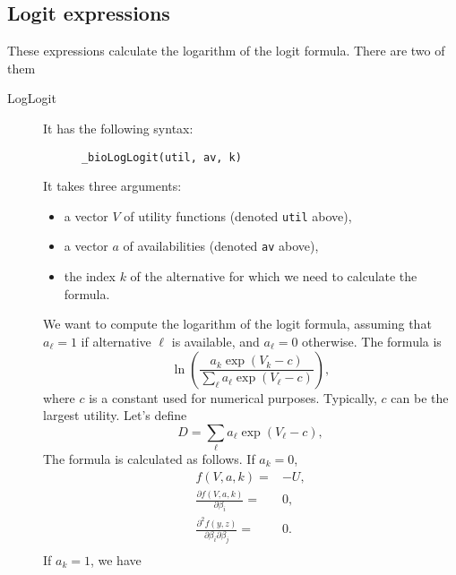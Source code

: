 \documentclass[12pt,a4paper]{article}
\begin{document}
\subsection{Logit expressions}
These expressions calculate the logarithm of the logit formula. There are two of them
\begin{description}
\item[LogLogit] It has the following syntax:
    \begin{lstlisting}
      _bioLogLogit(util, av, k)
  \end{lstlisting}
It takes three arguments:
\begin{itemize}
\item a vector $V$ of utility functions (denoted \verb+util+ above),
\item a vector $a$ of availabilities (denoted \verb+av+ above),
\item the index $k$ of the alternative for which we need to calculate the formula.
\end{itemize}
We want to compute the logarithm of the logit formula, assuming that $a_\ell=1$ if alternative $\ell$ is available, and $a_\ell=0$ otherwise. The formula is
\[
\ln\left(\frac{a_k\exp(V_k-c)}{\sum_\ell a_\ell\exp(V_\ell -c)}\right),
\]
where $c$ is a constant used for numerical purposes. Typically, $c$ can be the largest utility.
Let's define
\[
D = \sum_{\ell} a_\ell\exp(V_\ell - c),
\]
The formula is calculated as follows.
If $a_k = 0$,
  \begin{align*}
    f(V, a, k) =& -U, \\
    \frac{\partial f(V, a, k)}{\partial \beta_i} =&  0, \\ 
    \frac{\partial^2 f(y, z)}{\partial \beta_i \partial \beta_j} =&0.\\
  \end{align*}
If $a_k = 1$, we have


\end{description}
\end{document}

